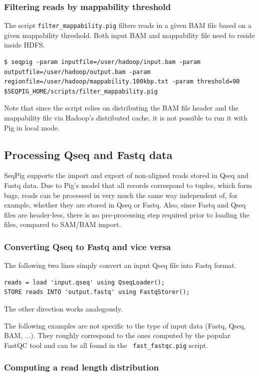 {\subsubsection{Filtering reads by mappability threshold}
The script {\tt filter\_mappability.pig} filters reads in a given BAM file based on a given
mappability threshold. Both input BAM and mappability file need to reside inside HDFS.
\begin{lstlisting}
$ seqpig -param inputfile=/user/hadoop/input.bam -param outputfile=/user/hadoop/output.bam -param regionfile=/user/hadoop/mappability.100kbp.txt -param threshold=90 $SEQPIG_HOME/scripts/filter_mappability.pig
\end{lstlisting}
Note that since the script relies on distributing the BAM file header and the
mappability file via Hadoop's distributed cache, it is not possible to run it
with Pig in local mode.

\subsection{Processing Qseq and Fastq data}

SeqPig supports the import and export of non-aligned reads stored in
Qseq and Fastq data. Due to Pig's model that all records correspond to
tuples, which form bags, reads can be processed in very much the same
way independent of, for example, whether they are stored in Qseq or
Fastq. Also, since Fastq and Qseq files are header-less, there is no
pre-processing step required prior to loading the files, compared to
SAM/BAM import.

\subsubsection{Converting Qseq to Fastq and vice versa}

The following two lines simply convert an input Qseq file into Fastq format.
\begin{lstlisting}
reads = load 'input.qseq' using QseqLoader();
STORE reads INTO 'output.fastq' using FastqStorer(); 
\end{lstlisting}
The other direction works analogously.

The following examples are not specific to the type of input data
(Fastq, Qseq, BAM, $\ldots$). They roughly correspond to the ones
computed by the popular FastQC tool and can be all found in the {\tt
  fast\_fastqc.pig} script.

\subsubsection{Computing a read length distribution}
\label{sect:read_length_dist}

}
